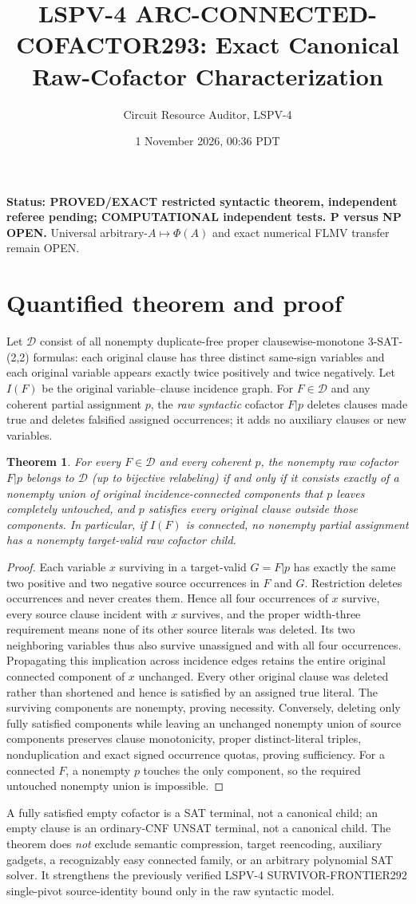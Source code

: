 \documentclass[10pt]{article}
\title{LSPV-4 ARC-CONNECTED-COFACTOR293: Exact Canonical Raw-Cofactor Characterization}
\author{Circuit Resource Auditor, LSPV-4}
\date{1 November 2026, 00:36 PDT}
\newtheorem{theorem}{Theorem}
\begin{document}
\maketitle
\noindent\textbf{Status: PROVED/EXACT restricted syntactic theorem, independent referee pending; COMPUTATIONAL independent tests. P versus NP OPEN.} Universal arbitrary-$A\mapsto\Phi(A)$ and exact numerical FLMV transfer remain OPEN.
\section{Quantified theorem and proof}
Let $\mathcal D$ consist of all nonempty duplicate-free proper clausewise-monotone 3-SAT-(2,2) formulas: each original clause has three distinct same-sign variables and each original variable appears exactly twice positively and twice negatively. Let $I(F)$ be the original variable--clause incidence graph. For $F\in\mathcal D$ and any coherent partial assignment $p$, the \emph{raw syntactic} cofactor $F|p$ deletes clauses made true and deletes falsified assigned occurrences; it adds no auxiliary clauses or new variables.
\begin{theorem}
For every $F\in\mathcal D$ and every coherent $p$, the nonempty raw cofactor $F|p$ belongs to $\mathcal D$ (up to bijective relabeling) \emph{if and only if} it consists exactly of a nonempty union of original incidence-connected components that $p$ leaves completely untouched, and $p$ satisfies every original clause outside those components. In particular, if $I(F)$ is connected, no nonempty partial assignment has a nonempty target-valid raw cofactor child.
\end{theorem}
\begin{proof}
Each variable $x$ surviving in a target-valid $G=F|p$ has exactly the same two positive and two negative source occurrences in $F$ and $G$. Restriction deletes occurrences and never creates them. Hence all four occurrences of $x$ survive, every source clause incident with $x$ survives, and the proper width-three requirement means none of its other source literals was deleted. Its two neighboring variables thus also survive unassigned and with all four occurrences. Propagating this implication across incidence edges retains the entire original connected component of $x$ unchanged. Every other original clause was deleted rather than shortened and hence is satisfied by an assigned true literal. The surviving components are nonempty, proving necessity. Conversely, deleting only fully satisfied components while leaving an unchanged nonempty union of source components preserves clause monotonicity, proper distinct-literal triples, nonduplication and exact signed occurrence quotas, proving sufficiency. For a connected $F$, a nonempty $p$ touches the only component, so the required untouched nonempty union is impossible.
\end{proof}
A fully satisfied empty cofactor is a SAT terminal, not a canonical child; an empty clause is an ordinary-CNF UNSAT terminal, not a canonical child. The theorem does \emph{not} exclude semantic compression, target reencoding, auxiliary gadgets, a recognizably easy connected family, or an arbitrary polynomial SAT solver. It strengthens the previously verified LSPV-4 SURVIVOR-FRONTIER292 single-pivot source-identity bound only in the raw syntactic model.
\end{document}
